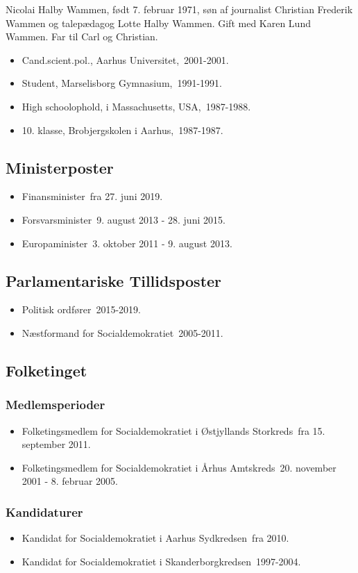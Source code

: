 \documentclass[11pt, a4paper]{awesome-cv}
\begin{document}
\makecvheader[R]
\makelettertitle
\begin{cvletter}
Nicolai Halby Wammen, født 7. februar 1971, søn af journalist Christian Frederik Wammen og talepædagog Lotte Halby Wammen. Gift med Karen Lund Wammen. Far til Carl og Christian.

\begin{itemize}
\item Cand.scient.pol., Aarhus Universitet, 2001-2001.
\item Student, Marselisborg Gymnasium, 1991-1991.
\item High schoolophold, i Massachusetts, USA, 1987-1988.
\item 10. klasse, Brobjergskolen i Aarhus, 1987-1987.
\end{itemize}
\subsection*{Ministerposter}
\begin{itemize}
\item Finansminister fra 27. juni 2019.
\item Forsvarsminister 9. august 2013 - 28. juni 2015.
\item Europaminister 3. oktober 2011 - 9. august 2013.
\end{itemize}
\subsection*{Parlamentariske Tillidsposter}
\begin{itemize}
\item Politisk ordfører 2015-2019.
\item Næstformand for Socialdemokratiet 2005-2011.
\end{itemize}
\subsection*{Folketinget}
\subsubsection*{Medlemsperioder}
\begin{itemize}
\item Folketingsmedlem for Socialdemokratiet i Østjyllands Storkreds fra 15. september 2011.
\item Folketingsmedlem for Socialdemokratiet i Århus Amtskreds 20. november 2001 - 8. februar 2005.
\end{itemize}
\subsubsection*{Kandidaturer}
\begin{itemize}
\item Kandidat for Socialdemokratiet i Aarhus Sydkredsen fra 2010.
\item Kandidat for Socialdemokratiet i Skanderborgkredsen 1997-2004.
\end{itemize}
\end{cvletter}
\end{document}
